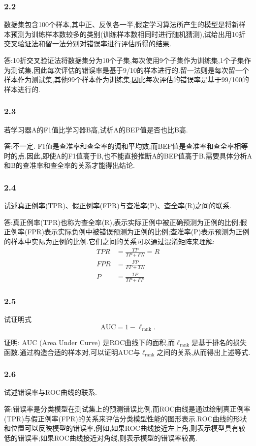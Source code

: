 \subsubsection*{2.2}
数据集包含100个样本,其中正、反例各一半,假定学习算法所产生的模型是将新样本预测为训练样本数较多的类别(训练样本数相同时进行随机猜测),试给出用10折交叉验证法和留一法分别对错误率进行评估所得的结果.

\par 答:10折交叉验证法将数据集分为10个子集,每次使用9个子集作为训练集,1个子集作为测试集,因此每次评估的错误率是基于9/10的样本进行的.留一法则是每次留一个样本作为测试集,其他99个样本作为训练集,因此每次评估的错误率是基于99/100的样本进行的.
\subsubsection*{2.3}
若学习器A的F1值比学习器B高,试析A的BEP值是否也比B高.
\par 答:不一定. F1值是查准率和查全率的调和平均数,而BEP值是查准率和查全率相等时的点.因此,即使A的F1值高于B,也不能直接推断A的BEP值高于B.需要具体分析A和B的查准率和查全率的关系才能得出结论.
\subsubsection*{2.4}
试述真正例率(TPR)、假正例率(FPR)与查准率(P)、查全率(R)之间的联系.
\par 答:真正例率(TPR)也称为查全率(R),表示实际正例中被正确预测为正例的比例;假正例率(FPR)表示实际负例中被错误预测为正例的比例;查准率(P)表示预测为正例的样本中实际为正例的比例.它们之间的关系可以通过混淆矩阵来理解:
\begin{align*}
    TPR &= \frac{TP}{TP + FN} = R \\
    FPR &= \frac{FP}{FP + TN} \\
    P &= \frac{TP}{TP + FP}
\end{align*}
\subsubsection*{2.5}
试证明式\begin{equation}
    \text{AUC} = 1 - \ell_{\text{rank}}.
\end{equation}
\par   证明: AUC (Area Under Curve) 是ROC曲线下的面积,而$\ell_{\text{rank}}$是基于排名的损失函数.通过构造合适的样本对,可以证明AUC与$\ell_{\text{rank}}$之间的关系,从而得出上述等式.
\subsubsection*{2.6}
试述错误率与ROC曲线的联系.
\par 答:错误率是分类模型在测试集上的预测错误比例,而ROC曲线是通过绘制真正例率(TPR)与假正例率(FPR)的关系来评估分类模型性能的图形表示.ROC曲线的形状和位置可以反映模型的错误率,例如,如果ROC曲线接近左上角,则表示模型具有较低的错误率;如果ROC曲线接近对角线,则表示模型的错误率较高.
